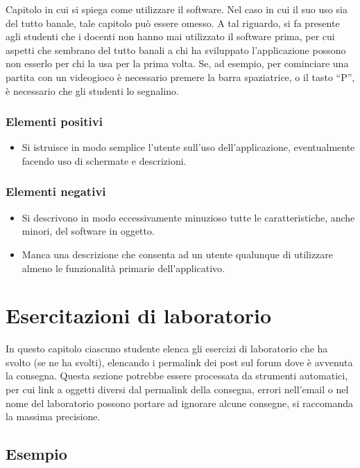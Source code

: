 \documentclass[a4paper,12pt]{report}
\begin{document}
Capitolo in cui si spiega come utilizzare il software. Nel caso in cui il suo uso sia del tutto
banale, tale capitolo può essere omesso.
%
A tal riguardo, si fa presente agli studenti che i docenti non hanno mai utilizzato il software
prima, per cui aspetti che sembrano del tutto banali a chi ha sviluppato l'applicazione possono non
esserlo per chi la usa per la prima volta.
%
Se, ad esempio, per cominciare una partita con un videogioco è necessario premere la barra
spaziatrice, o il tasto ``P'', è necessario che gli studenti lo segnalino.

\subsection*{Elementi positivi}

\begin{itemize}
 \item Si istruisce in modo semplice l'utente sull'uso dell'applicazione, eventualmente facendo uso di schermate e descrizioni.
\end{itemize}

\subsection*{Elementi negativi}
\begin{itemize}
 \item Si descrivono in modo eccessivamente minuzioso tutte le caratteristiche, anche minori, del software in oggetto.
 \item Manca una descrizione che consenta ad un utente qualunque di utilizzare almeno le funzionalità primarie dell'applicativo.
\end{itemize}

\chapter{Esercitazioni di laboratorio}

In questo capitolo ciascuno studente elenca gli esercizi di laboratorio che ha svolto
(se ne ha svolti),
elencando i permalink dei post sul forum dove è avvenuta la consegna.
%
Questa sezione potrebbe essere processata da strumenti automatici,
per cui link a oggetti diversi dal permalink della consegna,
errori nell'email o nel nome del laboratorio possono portare ad ignorare alcune consegne,
si raccomanda la massima precisione.

\section*{Esempio}
\end{document}
